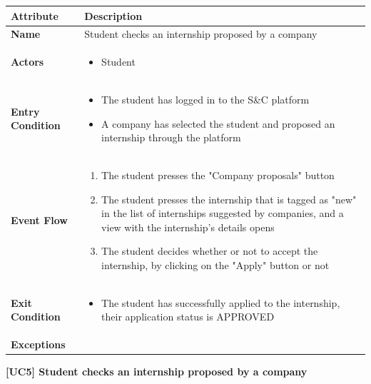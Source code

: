 \begin{center}
    
    \begin{tabular}{|p{3cm}|p{9cm}|}
    \hline
    \textbf{Attribute} & \textbf{Description} \\ \hline
    \textbf{Name} & Student checks an internship proposed by a company \\ \hline
    \textbf{Actors} & 
    \begin{itemize}
        \item Student
    \end{itemize} \\ \hline
    \textbf{Entry Condition} & 
    \begin{itemize}
        \item The student has logged in to the S\&C platform
        \item A company has selected the student and proposed an internship through the platform
    \end{itemize} \\ \hline
    \textbf{Event Flow} & 
    \begin{enumerate}
        \item The student presses the "Company proposals" button
        \item The student presses the internship that is tagged as "new" in the list of internships suggested by companies, and a view with the internship's details opens
        \item The student decides whether or not to accept the internship, by clicking on the "Apply" button or not
    \end{enumerate} \\ \hline
    \textbf{Exit Condition} &
    \begin{itemize}
        \item The student has successfully applied to the internship, their application status is APPROVED
    \end{itemize}
    \\ \hline
    \textbf{Exceptions} & \\ \hline
    \end{tabular}
    \newline
    \newline
    \textbf{[UC5] Student checks an internship proposed by a company}
    \newline
    \newline
    

\end{center}
